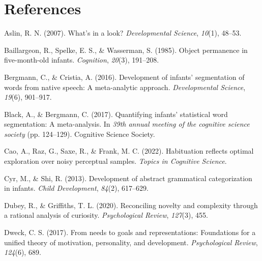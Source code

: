 \documentclass[10pt, letterpaper]{article}
\newenvironment{CSLReferences}%
  {}%
  {\par}
\begin{document}
\hypertarget{references}{%
\section{References}\label{references}}

\setlength{\parindent}{-0.1in} 
\setlength{\leftskip}{0.125in}

\noindent

\hypertarget{refs}{}
\begin{CSLReferences}{1}{0}
\leavevmode{}%
Aslin, R. N. (2007). What's in a look? \emph{Developmental Science},
\emph{10}(1), 48--53.

\leavevmode{}%
Baillargeon, R., Spelke, E. S., \& Wasserman, S. (1985). Object
permanence in five-month-old infants. \emph{Cognition}, \emph{20}(3),
191--208.

\leavevmode{}%
Bergmann, C., \& Cristia, A. (2016). Development of infants'
segmentation of words from native speech: A meta-analytic approach.
\emph{Developmental Science}, \emph{19}(6), 901--917.

\leavevmode{}%
Black, A., \& Bergmann, C. (2017). Quantifying infants' statistical word
segmentation: A meta-analysis. In \emph{39th annual meeting of the
cognitive science society} (pp. 124--129). Cognitive Science Society.

\leavevmode{}%
Cao, A., Raz, G., Saxe, R., \& Frank, M. C. (2022). Habituation reflects
optimal exploration over noisy perceptual samples. \emph{Topics in
Cognitive Science}.

\leavevmode{}%
Cyr, M., \& Shi, R. (2013). Development of abstract grammatical
categorization in infants. \emph{Child Development}, \emph{84}(2),
617--629.

\leavevmode{}%
Dubey, R., \& Griffiths, T. L. (2020). Reconciling novelty and
complexity through a rational analysis of curiosity. \emph{Psychological
Review}, \emph{127}(3), 455.

\leavevmode{}%
Dweck, C. S. (2017). From needs to goals and representations:
Foundations for a unified theory of motivation, personality, and
development. \emph{Psychological Review}, \emph{124}(6), 689.


\end{CSLReferences}
\end{document}
